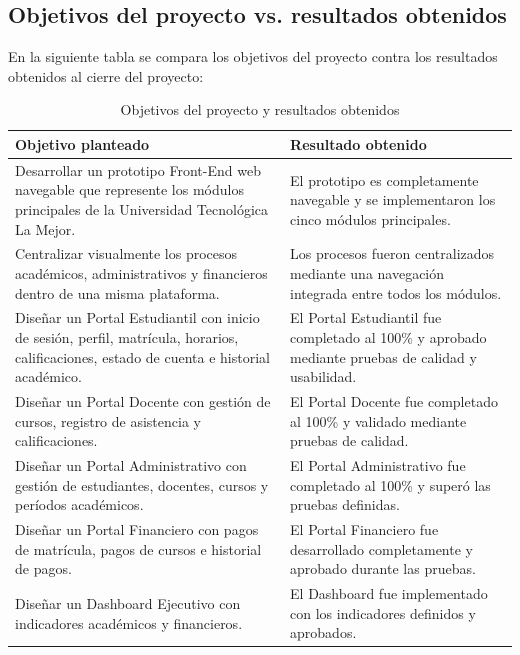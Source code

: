 \documentclass[11pt,spanish]{article}
\begin{document}
\subsection{Objetivos del proyecto vs. resultados obtenidos}
En la siguiente tabla se compara los objetivos del proyecto contra los resultados obtenidos al cierre del proyecto:
\begin{table}[H]
\centering
\caption{Objetivos del proyecto y resultados obtenidos}
\label{tab:objetivos-resultados}
{\small
\begin{tabularx}{\textwidth}{p{6cm}Y}
\toprule
\textbf{Objetivo planteado} &
\textbf{Resultado obtenido} \\
\midrule

Desarrollar un prototipo Front-End web navegable que represente los módulos principales de la Universidad Tecnológica La Mejor.
&
El prototipo es completamente navegable y se implementaron los cinco módulos principales.
\\

Centralizar visualmente los procesos académicos, administrativos y financieros dentro de una misma plataforma.
&
Los procesos fueron centralizados mediante una navegación integrada entre todos los módulos.
\\

Diseñar un Portal Estudiantil con inicio de sesión, perfil, matrícula, horarios, calificaciones, estado de cuenta e historial académico.
&
El Portal Estudiantil fue completado al 100\% y aprobado mediante pruebas de calidad y usabilidad.
\\

Diseñar un Portal Docente con gestión de cursos, registro de asistencia y calificaciones.
&
El Portal Docente fue completado al 100\% y validado mediante pruebas de calidad.
\\

Diseñar un Portal Administrativo con gestión de estudiantes, docentes, cursos y períodos académicos.
&
El Portal Administrativo fue completado al 100\% y superó las pruebas definidas.
\\

Diseñar un Portal Financiero con pagos de matrícula, pagos de cursos e historial de pagos.
&
El Portal Financiero fue desarrollado completamente y aprobado durante las pruebas.
\\

Diseñar un Dashboard Ejecutivo con indicadores académicos y financieros.
&
El Dashboard fue implementado con los indicadores definidos y aprobados.
\\


\end{tabularx}}
\end{table}
\end{document}
